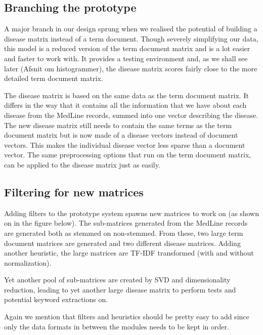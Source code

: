 \subsection{Branching the prototype\label{DiseaseMatrix}}

A major branch in our design sprung when we realised the potential of
building a disease matrix instead of a term document. Though severely
simplifying our data, this model is a reduced version of the term
document matrix and is a lot easier and faster to work with. It
provides a testing environment and, as we shall see later (Afsnit om
histogrammer), the disease matrix scores fairly close to the
more detailed term document matrix.

The disease matrix is based on the same data as the term document
matrix. It differs in the way that it contains all the information
that we have about each disease from the MedLine records, summed into
one vector describing the disease. The new disease matrix still needs to
contain the same terms as the term document matrix but is now made of
a disease vectors instead of document vectors. This makes the
individual disease vector less sparse than a document vector. The same
preprocessing options that run on the term document matrix, can be
applied to the disease matrix just as easily.

\subsection{Filtering for new matrices\label{FilteringMatrix}}

Adding filters to the prototype system spawns new matrices to work on
(as shown on in the figure below). The sub-matrices generated from the
MedLine records are generated both as stemmed on non-stemmed. From
these, two large term document matrices are generated and two
different disease matrices. Adding another heuristic, the large
matrices are TF-IDF transformed (with and without normalization).

Yet another pool of sub-matrices are created by SVD and dimensionality
reduction, leading to yet another large disease matrix to perform
tests and potential keyword extractions on.

Again we mention that filters and heuristics should be pretty easy to
add since only the data formats in between the modules needs to be
kept in order.

